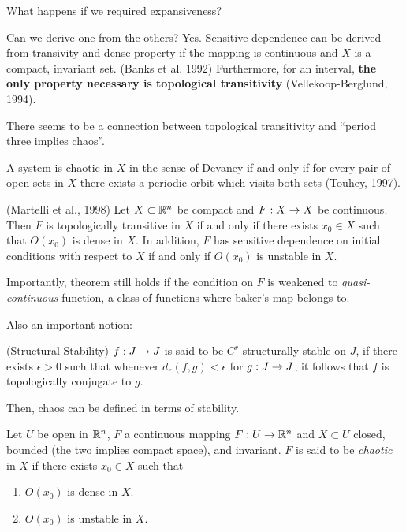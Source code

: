\documentclass[11pt]{article}
\begin{document}
What happens if we required expansiveness?

Can we derive one from the others? Yes. Sensitive dependence
can be derived from transivity and dense property if the mapping
is continuous and $X$ is a compact, invariant set. (Banks et al. 1992)
Furthermore, for an interval, {\bf the only property necessary is
topological transitivity} (Vellekoop-Berglund, 1994).

There seems to be a connection between topological transitivity and
``period three implies chaos''.

A system is chaotic in $X$ in the sense of Devaney if and only if
for every pair of open sets in $X$ there exists a periodic orbit 
which visits both sets (Touhey, 1997).

\begin{theorem}
  (Martelli et al., 1998)
  Let $X\subset \mathbb{R}^n$ be compact and $F: X\rightarrow X$ be continuous.
  Then $F$ is topologically transitive in $X$ if and only if
  there exists $x_0\in X$ such that $O(x_0)$ is dense in $X$.
  In addition, $F$ has sensitive dependence on initial conditions 
  with respect to $X$ if and only if $O(x_0)$ is unstable in $X$.
  \label{<++>}
\end{theorem}

Importantly, theorem still holds if the condition on $F$ is 
weakened to {\it quasi-continuous} function, a class of functions
where baker's map belongs to.


Also an important notion:
\begin{definition}
  (Structural Stability) $f: J \rightarrow J$ is said to be $C^r$-structurally
  stable on $J$, if there exists $\epsilon > 0$ such that whenever
  $d_r(f,g) < \epsilon$ for $g: J\rightarrow J$, it follows that $f$
  is topologically conjugate to $g$.
\end{definition}

Then, chaos can be defined in terms of stability.
\begin{definition}
  Let $U$ be open in $\mathbb{R}^n$, $F$ a continuous mapping $F: U\rightarrow \mathbb{R}^n$ and $X\subset U$
  closed, bounded (the two implies compact space), and invariant.
  $F$ is said to be {\it chaotic} in $X$ if there exists $x_0\in X$
  such that
  \begin{enumerate}
    \item $O(x_0)$ is dense in $X$.
    \item $O(x_0)$ is unstable in $X$.
  \end{enumerate}
  \end{definition}
\end{document}
